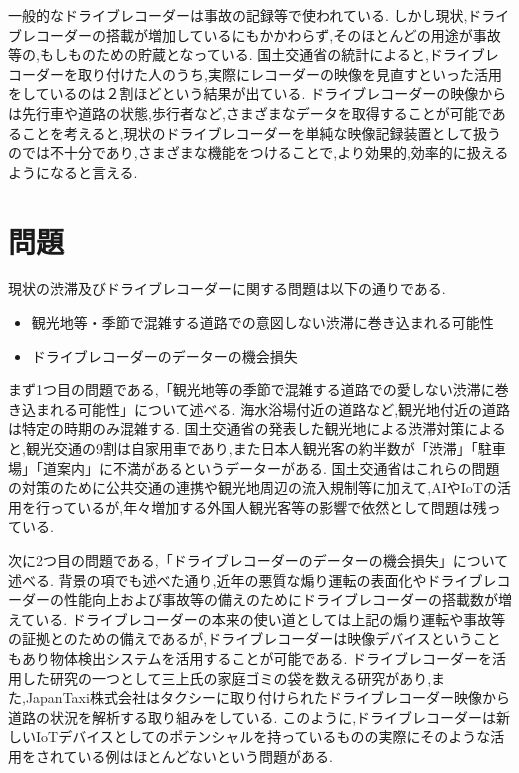 一般的なドライブレコーダーは事故の記録等で使われている.
しかし現状,ドライブレコーダーの搭載が増加しているにもかかわらず,そのほとんどの用途が事故等の,もしものための貯蔵となっている.
国土交通省の統計によると,ドライブレコーダーを取り付けた人のうち,実際にレコーダーの映像を見直すといった活用をしているのは２割ほどという結果が出ている\cite{ministryofland}.
ドライブレコーダーの映像からは先行車や道路の状態,歩行者など,さまざまなデータを取得することが可能であることを考えると,現状のドライブレコーダーを単純な映像記録装置として扱うのでは不十分であり,さまざまな機能をつけることで,より効果的,効率的に扱えるようになると言える.

\section{問題}
現状の渋滞及びドライブレコーダーに関する問題は以下の通りである.

\begin{itemize}
  \item 観光地等・季節で混雑する道路での意図しない渋滞に巻き込まれる可能性
  \item ドライブレコーダーのデーターの機会損失
\end{itemize}

まず1つ目の問題である,「観光地等の季節で混雑する道路での愛しない渋滞に巻き込まれる可能性」について述べる.
海水浴場付近の道路など,観光地付近の道路は特定の時期のみ混雑する.
国土交通省の発表した観光地による渋滞対策\cite{kankou_jam}によると,観光交通の9割は自家用車であり,また日本人観光客の約半数が「渋滞」「駐車場」「道案内」に不満があるというデーターがある.
国土交通省はこれらの問題の対策のために公共交通の連携や観光地周辺の流入規制等に加えて,AIやIoTの活用を行っている\cite{kankou_ai}が,年々増加する外国人観光客等の影響で依然として問題は残っている.

次に2つ目の問題である,「ドライブレコーダーのデーターの機会損失」について述べる.
背景の項でも述べた通り,近年の悪質な煽り運転の表面化やドライブレコーダーの性能向上および事故等の備えのためにドライブレコーダーの搭載数が増えている.
ドライブレコーダーの本来の使い道としては上記の煽り運転や事故等の証拠とのための備えであるが,ドライブレコーダーは映像デバイスということもあり物体検出システムを活用することが可能である.
ドライブレコーダーを活用した研究の一つとして三上氏の家庭ゴミの袋を数える研究\cite{三上量弘2020deepcounter}があり,また,JapanTaxi株式会社はタクシーに取り付けられたドライブレコーダー映像から道路の状況を解析する取り組みをしている\cite{japantaxi}.
このように,ドライブレコーダーは新しいIoTデバイスとしてのポテンシャルを持っているものの実際にそのような活用をされている例はほとんどないという問題がある.


